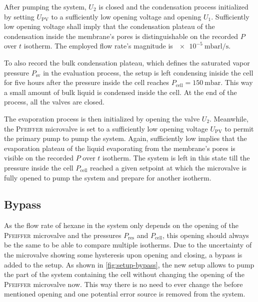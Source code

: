 \documentclass[../thesis.tex]{subfiles}
\begin{document}
                After pumping the system, $U_2$ is closed and the condensation process initialized by setting $U_\mathrm{PV}$ to a sufficiently low opening voltage and opening $U_1$. Sufficiently low opening voltage shall imply that the condensation plateau of the condensation inside the membrane's pores is distinguishable on the recorded $P$ over $t$ isotherm. The employed flow rate's magnitude is  $\SI{e-5}{\milli\bar\litre\per\second}$.

                To also record the bulk condensation plateau, which defines the saturated vapor pressure $P_\mathrm{sv}$ in the evaluation process, the setup is left condensing iniside the cell for five hours after the pressure inside the cell reaches $P_\mathrm{cell} = \SI{150}{\milli\bar}$. This way a small amount of bulk liquid is condensed inside the cell. At the end of the process, all the valves are closed.

                The evaporation process is then initialized by opening the valve $U_2$. Meanwhile, the \textsc{Pfeiffer} microvalve is set to a sufficiently low opening voltage $U_\mathrm{PV}$ to permit the primary pump to pump the system. Again, sufficiently low implies that the evaporation plateau of the  liquid evaporating from the membrane's pores is visible on the recorded $P$ over $t$ isotherm. The system is left in this state till the pressure inside the cell $P_\mathrm{cell}$ reached a given setpoint at which the microvalve is fully opened to pump the system and prepare for another isotherm.


            \subsection{Bypass}
            \label{subsec:bypass}

                As the flow rate of hexane in the system only depends on the opening of the \textsc{Pfeiffer} microvalve and the pressures $P_\mathrm{res}$ and $P_\mathrm{cell}$, this opening should always be the same to be able to compare multiple isotherms. Due to the uncertainty of the microvalve showing some hysteresis upon opening and closing, a bypass is added to the setup. As shown in \cref{fig:setup-bypass}, the new setup allows to pump the part of the system containing the cell without changing the opening of the \textsc{Pfeiffer} microvalve now. This way there is no need to ever change the before mentioned opening and one potential error source is removed from the system.
                \medskip
\end{document}
